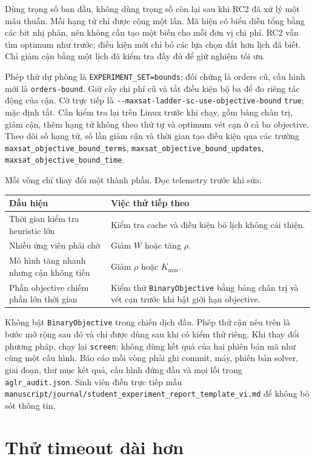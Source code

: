 \documentclass[11pt,a4paper]{article}
\newcommand{\code}[1]{\texttt{#1}}
\newcommand{\file}[1]{\nolinkurl{#1}}
\begin{document}
Dùng trọng số ban đầu, không dùng trọng số còn lại sau khi RC2 đã xử lý một
mâu thuẫn. Mỗi hạng tử chỉ được cộng một lần. Mã hiện có biểu diễn tổng bằng
các bit nhị phân, nên không cần tạo một biến cho mỗi đơn vị chi phí. RC2
vẫn tìm optimum như trước; điều kiện mới chỉ bỏ các lựa chọn đắt hơn lịch
đã biết. Chỉ giảm cận bằng một lịch đã kiểm tra đầy đủ để giữ nghiệm tối ưu.

Phép thử dự phòng là \code{EXPERIMENT\_SET=bounds}; đối chứng là orders cũ,
cấu hình mới là \code{orders-bound}. Giữ cây chi phí cũ và tắt điều kiện bộ
ba để đo riêng tác động của cận. Cờ trực tiếp là
\file{--maxsat-ladder-sc-use-objective-bound} \code{true}; mặc định tắt. Cần kiểm
tra lại trên Linux trước khi chạy, gồm bảng chân trị, giảm cận, thêm hạng tử
không theo thứ tự và optimum vét cạn ở cả ba objective. Theo dõi số hạng tử,
số lần giảm cận và thời gian tạo điều kiện qua các trường
\code{maxsat\_objective\_bound\_terms},
\code{maxsat\_objective\_bound\_updates},
\code{maxsat\_objective\_bound\_time}.

Mỗi vòng chỉ thay đổi một thành phần. Đọc telemetry trước khi sửa:

\begin{tabularx}{\textwidth}{@{}p{50mm}X@{}}
\toprule
Dấu hiệu & Việc thử tiếp theo \\
\midrule
Thời gian kiểm tra heuristic lớn & Kiểm tra cache và điều kiện bỏ lịch không cải thiện. \\
Nhiều ứng viên phải chờ & Giảm $W$ hoặc tăng $\rho$. \\
Mô hình tăng nhanh nhưng cận không tiến & Giảm $\rho$ hoặc $K_{\min}$. \\
Phần objective chiếm phần lớn thời gian & Kiểm thử \code{BinaryObjective} bằng
bảng chân trị và vét cạn trước khi bật giới hạn objective. \\
\bottomrule
\end{tabularx}

Không bật \code{BinaryObjective} trong chiến dịch đầu. Phép thử cận nêu trên
là bước mở rộng sau đó và chỉ được dùng sau khi có kiểm thử riêng. Khi thay đổi phương pháp, chạy
lại \code{screen}; không dùng kết quả của hai phiên bản mã như cùng một cấu hình.
Báo cáo mỗi vòng phải ghi commit, máy, phiên bản solver, giai đoạn, thư mục kết
quả, cấu hình đứng đầu và mọi lỗi trong \file{aglr_audit.json}.
Sinh viên điền trực tiếp mẫu
\file{manuscript/journal/student_experiment_report_template_vi.md} để không bỏ
sót thông tin.

\section{Thử timeout dài hơn}
\end{document}
